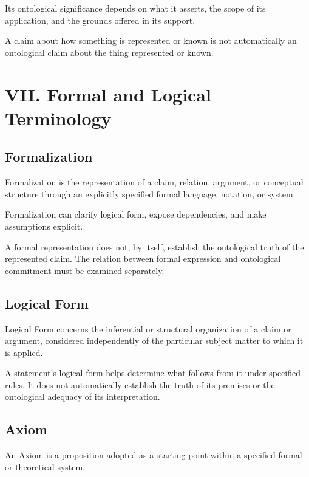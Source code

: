 Its ontological significance depends on what it asserts, the scope
of its application, and the grounds offered in its support.

A claim about how something is represented or known is not automatically
an ontological claim about the thing represented or known.



\section*{VII. Formal and Logical Terminology}


\subsection*{Formalization}

Formalization is the representation of a claim, relation, argument,
or conceptual structure through an explicitly specified formal
language, notation, or system.

Formalization can clarify logical form, expose dependencies, and
make assumptions explicit.

A formal representation does not, by itself, establish the ontological
truth of the represented claim. The relation between formal expression
and ontological commitment must be examined separately.


\subsection*{Logical Form}

Logical Form concerns the inferential or structural organization
of a claim or argument, considered independently of the particular
subject matter to which it is applied.

A statement's logical form helps determine what follows from it
under specified rules. It does not automatically establish the truth
of its premises or the ontological adequacy of its interpretation.


\subsection*{Axiom}

An Axiom is a proposition adopted as a starting point within a specified
formal or theoretical system.

